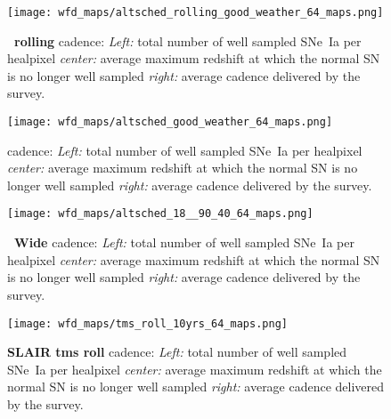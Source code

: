 

\begin{figure}[!htbp]
  \begin{center}
    \texttt{[image: wfd\_maps/altsched\_rolling\_good\_weather\_64\_maps.png]}
    \caption{ {\bf \altsched~rolling} cadence: {\em Left:} total number
      of well sampled SNe~Ia per healpixel {\em center:} average
      maximum redshift at which the normal SN is no longer well
      sampled {\em right:} average cadence delivered by the survey.}
    \label{fig:altsched_rolling_good_weather}
  \end{center}
\end{figure}


  
\begin{figure}[!htbp]
  \begin{center}
    \texttt{[image: wfd\_maps/altsched\_good\_weather\_64\_maps.png]}
    \caption{ {\bf \altsched} cadence: {\em Left:} total number of well
      sampled SNe~Ia per healpixel {\em center:} average maximum
      redshift at which the normal SN is no longer well sampled {\em
        right:} average cadence delivered by the survey.}
    \label{fig:altsched_good_weather}
  \end{center}
\end{figure}

  
\begin{figure}[!htbp]
  \begin{center}
    \texttt{[image: wfd\_maps/altsched\_18\_\_90\_40\_64\_maps.png]}
    \caption{{\bf \altsched~Wide} cadence: {\em Left:} total number of well
      sampled SNe~Ia per healpixel {\em center:} average maximum
      redshift at which the normal SN is no longer well sampled {\em
        right:} average cadence delivered by the survey.}
  \end{center}
  \label{fig:altsched_wide}
\end{figure}



  \begin{figure}[!htbp]
  \begin{center}
    \texttt{[image: wfd\_maps/tms\_roll\_10yrs\_64\_maps.png]}
    \caption{{\bf SLAIR tms roll} cadence: {\em Left:} total number of well
      sampled SNe~Ia per healpixel {\em center:} average maximum
      redshift at which the normal SN is no longer well sampled {\em
        right:} average cadence delivered by the survey.}
    \label{fig:tms_roll}
  \end{center}
\end{figure}

